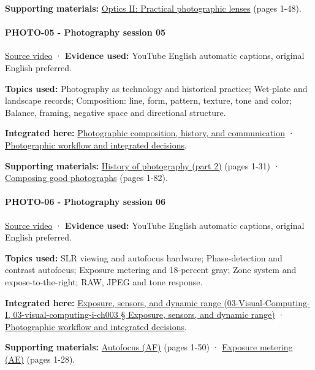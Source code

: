 \textbf{Supporting materials:} \href{https://drive.google.com/open?id=0B6w2XfPHEcZYTnZIR2VpWThHM0U}{Optics II: Practical photographic lenses} (pages 1-48).

\paragraph{PHOTO-05 - Photography session 05}\label{photo-05---photography-session-05}

\href{https://www.youtube.com/watch?v=VCcDJAiObEw}{Source video} · \textbf{Evidence used:} YouTube English automatic captions, original English preferred.

\textbf{Topics used:} Photography as technology and historical practice; Wet-plate and landscape records; Composition: line, form, pattern, texture, tone and color; Balance, framing, negative space and directional structure.

\textbf{Integrated here:} \hyperref[04-visual-computing-ii-ch034]{Photographic composition, history, and communication} · \hyperref[04-visual-computing-ii-ch034]{Photographic workflow and integrated decisions}.

\textbf{Supporting materials:} \href{https://drive.google.com/open?id=0B6w2XfPHEcZYNm5MczhBTkxsanc}{History of photography (part 2)} (pages 1-31) · \href{https://drive.google.com/file/d/0B6w2XfPHEcZYSkZXWG9mSGpFMVk/view?usp=sharing}{Composing good photographs} (pages 1-82).

\paragraph{PHOTO-06 - Photography session 06}\label{photo-06---photography-session-06}

\href{https://www.youtube.com/watch?v=njlDb9-6aOU}{Source video} · \textbf{Evidence used:} YouTube English automatic captions, original English preferred.

\textbf{Topics used:} SLR viewing and autofocus hardware; Phase-detection and contrast autofocus; Exposure metering and 18-percent gray; Zone system and expose-to-the-right; RAW, JPEG and tone response.

\textbf{Integrated here:} \href{}{Exposure, sensors, and dynamic range (03-Visual-Computing-I, 03-visual-computing-i-ch003 § Exposure, sensors, and dynamic range)} · \hyperref[04-visual-computing-ii-ch034]{Photographic workflow and integrated decisions}.

\textbf{Supporting materials:} \href{https://drive.google.com/open?id=0B6w2XfPHEcZYQnR3SG43Z2VIRmM}{Autofocus (AF)} (pages 1-50) · \href{https://drive.google.com/open?id=0B6w2XfPHEcZYbG9EWlhacm80SFE}{Exposure metering (AE)} (pages 1-28).

